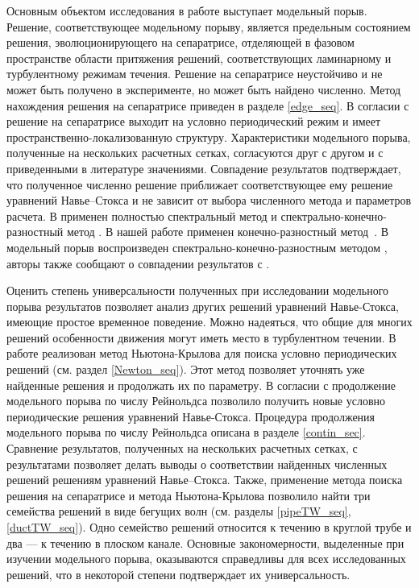 Основным объектом исследования в работе выступает модельный порыв. Решение, соответствующее модельному порыву, является предельным состоянием решения, эволюционирующего на сепаратрисе, отделяющей в фазовом пространстве области притяжения решений, соответствующих ламинарному и турбулентному режимам течения. Решение на сепаратрисе неустойчиво и не может быть получено в эксперименте, но может быть найдено численно. Метод нахождения решения на сепаратрисе приведен в разделе \ref{edge_seq}. В согласии с \cite{Avila2013} решение на сепаратрисе выходит на условно периодический режим и имеет пространственно-локализованную структуру. Характеристики модельного порыва, полученные на нескольких расчетных сетках, согласуются друг с другом и с приведенными в литературе значениями. Совпадение результатов подтверждает, что полученное численно решение приближает соответствующее ему решение уравнений Навье--Стокса и не зависит от выбора численного метода и параметров расчета. В \cite{Avila2013} применен полностью спектральный метод \cite{Meseguer2007} и спектрально-конечно-разностный метод \cite{Willis2009}. В нашей работе применен конечно-разностный метод~\cite{Nikitin2006}. В \cite{Chantry2014} модельный порыв воспроизведен спектрально-конечно-разностным методом \cite{Willis2009}, авторы также сообщают о совпадении результатов с \cite{Avila2013}. 

Оценить степень универсальности полученных при исследовании модельного порыва результатов позволяет анализ других решений уравнений Навье-Стокса, имеющие простое временное поведение. Можно надеяться, что общие для многих решений особенности движения могут иметь место в турбулентном течении. В работе реализован метод Ньютона-Крылова \cite{Viswanath2007, Dijkstra2014} для поиска условно периодических решений (см. раздел  \ref{Newton_seq}). Этот метод позволяет уточнять уже найденные решения и продолжать их по параметру. В согласии с \cite{Avila2013} продолжение модельного порыва по числу Рейнольдса позволило получить новые условно периодические решения уравнений Навье-Стокса. Процедура продолжения модельного порыва по числу Рейнольдса описана в разделе \ref{contin_sec}. Сравнение результатов, полученных на нескольких расчетных сетках, с результатами \cite{Avila2013} позволяет делать выводы о соответствии найденных численных решений решениям уравнений Навье--Стокса. Также, применение метода поиска решения на сепаратрисе и метода Ньютона-Крылова позволило найти три семейства решений в виде бегущих волн (см. разделы \ref{pipeTW_seq}, \ref{ductTW_seq}). Одно семейство решений относится к течению в круглой трубе и два --- к течению в плоском канале. Основные закономерности, выделенные при изучении модельного порыва, оказываются справедливы для всех исследованных решений, что в некоторой степени подтверждает их универсальность. 

